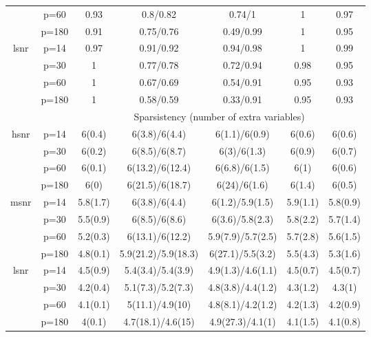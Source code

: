 \begin{table}[ht]
{\begin{tabular}{|c|c|ccccc|}
   & p=60 & 0.93 & 0.8/0.82 & 0.74/1 & 1 & 0.97 \\ 
   & p=180 & 0.91 & 0.75/0.76 & 0.49/0.99 & 1 & 0.95 \\ 
  \midrule\multirow{4}[2]{*}{lsnr} & p=14 & 0.97 & 0.91/0.92 & 0.94/0.98 & 1 & 0.99 \\ 
   & p=30 & 1 & 0.77/0.78 & 0.72/0.94 & 0.98 & 0.95 \\ 
   & p=60 & 1 & 0.67/0.69 & 0.54/0.91 & 0.95 & 0.93 \\ 
   & p=180 & 1 & 0.58/0.59 & 0.33/0.91 & 0.95 & 0.93 \\ 
   \midrule 
 \multicolumn{1}{|c}{} &       & \multicolumn{5}{c|}{Sparsistency (number of extra variables)} \\
\midrule\multirow{4}[2]{*}{hsnr} & p=14 & 6(0.4) & 6(3.8)/6(4.4) & 6(1.1)/6(0.9) & 6(0.6) & 6(0.6) \\ 
   & p=30 & 6(0.2) & 6(8.5)/6(8.7) & 6(3)/6(1.3) & 6(0.9) & 6(0.7) \\ 
   & p=60 & 6(0.1) & 6(13.2)/6(12.4) & 6(6.8)/6(1.5) & 6(1) & 6(0.6) \\ 
   & p=180 & 6(0) & 6(21.5)/6(18.7) & 6(24)/6(1.6) & 6(1.4) & 6(0.5) \\ 
  \midrule\multirow{4}[2]{*}{msnr} & p=14 & 5.8(1.7) & 6(3.8)/6(4.4) & 6(1.2)/5.9(1.5) & 5.9(1.1) & 5.8(0.9) \\ 
   & p=30 & 5.5(0.9) & 6(8.5)/6(8.6) & 6(3.6)/5.8(2.3) & 5.8(2.2) & 5.7(1.4) \\ 
   & p=60 & 5.2(0.3) & 6(13.1)/6(12.2) & 5.9(7.9)/5.7(2.5) & 5.7(2.8) & 5.6(1.5) \\ 
   & p=180 & 4.8(0.1) & 5.9(21.2)/5.9(18.3) & 6(27.1)/5.5(3.2) & 5.5(4.3) & 5.3(1.6) \\ 
  \midrule\multirow{4}[2]{*}{lsnr} & p=14 & 4.5(0.9) & 5.4(3.4)/5.4(3.9) & 4.9(1.3)/4.6(1.1) & 4.5(0.7) & 4.5(0.7) \\ 
   & p=30 & 4.2(0.4) & 5.1(7.3)/5.2(7.3) & 4.8(3.8)/4.4(1.2) & 4.3(1.2) & 4.3(1) \\ 
   & p=60 & 4.1(0.1) & 5(11.1)/4.9(10) & 4.8(8.1)/4.2(1.2) & 4.2(1.3) & 4.2(0.9) \\ 
   & p=180 & 4(0.1) & 4.7(18.1)/4.6(15) & 4.9(27.3)/4.1(1) & 4.1(1.5) & 4.1(0.8) \\ 
   \bottomrule 
\end{tabular}
}
\end{table}
